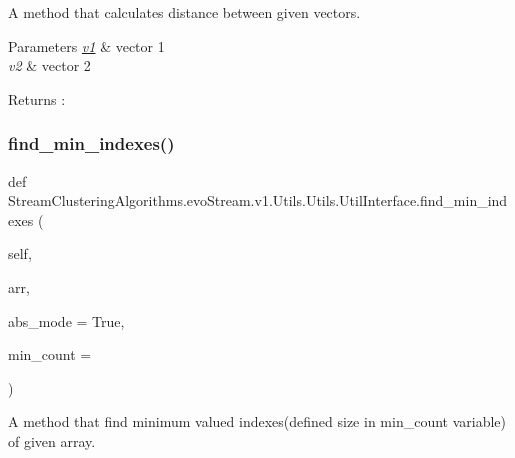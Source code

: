 A method that calculates distance between given vectors. 


\begin{DoxyParams}{Parameters}
{\em \hyperlink{namespaceStreamClusteringAlgorithms_1_1evoStream_1_1v1}{v1}} & vector 1 \\
\hline
{\em v2} & vector 2 \\
\hline
\end{DoxyParams}
\begin{DoxyReturn}{Returns}
\+: 
\end{DoxyReturn}
\mbox{\label{classStreamClusteringAlgorithms_1_1evoStream_1_1v1_1_1Utils_1_1Utils_1_1UtilInterface_a7b462b054952e41d6698aa70193bd585}} 
\subsubsection{\texorpdfstring{find\+\_\+min\+\_\+indexes()}{find\_min\_indexes()}}
{\footnotesize\ttfamily def Stream\+Clustering\+Algorithms.\+evo\+Stream.\+v1.\+Utils.\+Utils.\+Util\+Interface.\+find\+\_\+min\+\_\+indexes (\begin{DoxyParamCaption}\item[{}]{self,  }\item[{}]{arr,  }\item[{}]{abs\+\_\+mode = {\ttfamily True},  }\item[{}]{min\+\_\+count = {} }\end{DoxyParamCaption})}



A method that find minimum valued indexes(defined size in min\+\_\+count variable) of given array. 

